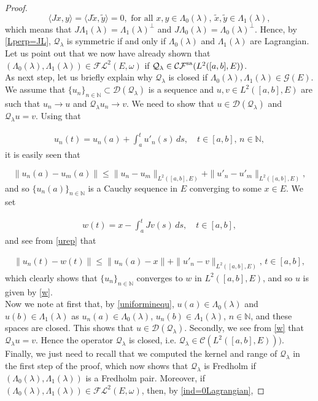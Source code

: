 \documentclass[a4paper,10pt]{article}
\begin{document}
\begin{proof}
\[\langle Jx,y\rangle=\langle J\tilde{x},\tilde{y}\rangle=0,\text{ for all } x,y\in\Lambda_0(\lambda),\, \tilde{x},\tilde{y}\in\Lambda_1(\lambda),\]
which means that $J\Lambda_1(\lambda)=\Lambda_1(\lambda)^\perp$ and $J\Lambda_0(\lambda)=\Lambda_0(\lambda)^\perp$. Hence, by \eqref{Lperp=JL}, $\mathcal{Q}_\lambda$ is symmetric if and only if $\Lambda_0(\lambda)$ and $\Lambda_1(\lambda)$ are Lagrangian.\\
Let us point out that we now have already shown that $(\Lambda_0(\lambda),\Lambda_1(\lambda))\in\mathcal{FL}^2(E,\omega)$ if $\mathcal{Q}_\lambda\in\mathcal{CF}^\textup{sa}(L^2([a,b],E))$.\\
As next step, let us briefly explain why $\mathcal{Q}_\lambda$ is closed if $\Lambda_0(\lambda),\Lambda_1(\lambda)\in\mathcal{G}(E)$. We assume that $\{u_n\}_{n\in\mathbb{N}}\subset\mathcal{D}(\mathcal{Q}_\lambda)$ is a sequence and $u,v\in L^2([a,b],E)$ are such that $u_n\rightarrow u$ and $\mathcal{Q}_\lambda u_n\rightarrow v$. We need to show that $u\in\mathcal{D}(\mathcal{Q}_\lambda)$ and $\mathcal{Q}_\lambda u=v$. Using that

\begin{align}\label{urep}
u_n(t)=u_n(a)+\int^t_a{u'_n(s)\,ds},\quad t\in[a,b],\, n\in\mathbb{N},
\end{align} 
it is easily seen that

\[\|u_n(a)-u_m(a)\|\leq\|u_n-u_m\|_{L^2([a,b],E)}+\|u'_n-u'_m\|_{L^2([a,b],E)},\]
and so $\{u_n(a)\}_{n\in\mathbb{N}}$ is a Cauchy sequence in $E$ converging to some $x\in E$. We set

\begin{align}\label{w}
w(t)=x-\int^t_a{Jv(s)\, ds},\quad t\in[a,b],
\end{align}
and see from \eqref{urep} that 

\begin{align}\label{uniforminequ}
\|u_n(t)-w(t)\|\leq\|u_n(a)-x\|+\|u'_n-v\|_{L^2([a,b],E)},\, t\in[a,b],
\end{align}
which clearly shows that $\{u_n\}_{n\in\mathbb{N}}$ converges to $w$ in $L^2([a,b],E)$, and so $u$ is given by \eqref{w}.\\
Now we note at first that, by \eqref{uniforminequ}, $u(a)\in\Lambda_0(\lambda)$ and $u(b)\in\Lambda_1(\lambda)$ as $u_n(a)\in\Lambda_0(\lambda)$, $u_n(b)\in\Lambda_1(\lambda)$, $n\in\mathbb{N}$, and these spaces are closed. This shows that $u\in\mathcal{D}(\mathcal{Q}_\lambda)$. Secondly, we see from \eqref{w} that $\mathcal{Q}_\lambda u=v$. Hence the operator $\mathcal{Q}_\lambda$ is closed, i.e. $\mathcal{Q}_\lambda\in\mathcal{C}(L^2([a,b],E)))$.\\  
Finally, we just need to recall that we computed the kernel and range of $\mathcal{Q}_\lambda$ in the first step of the proof, which now shows that $\mathcal{Q}_\lambda$ is Fredholm if $(\Lambda_0(\lambda),\Lambda_1(\lambda))$ is a Fredholm pair. Moreover, if $(\Lambda_0(\lambda),\Lambda_1(\lambda))\in\mathcal{FL}^2(E,\omega)$, then, by \eqref{ind=0Lagrangian},


\end{proof}
\end{document}
